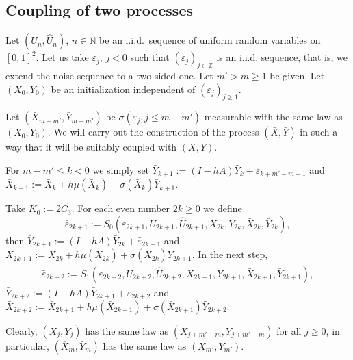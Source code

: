 \documentclass{article}
\begin{document}
\subsection{Coupling of two processes}\label{too}

Let $(U_n,\hat{U}_n)$, $n\in\mathbb{N}$ be an i.i.d.\ sequence of
uniform random variables on $[0,1]^2$. Let us take $\varepsilon_j$, $j<0$ such that $(\varepsilon_j)_{j\in\mathbb{Z}}$
is an i.i.d. sequence, that is, we extend the noise sequence to a two-sided one.
Let $m'>m\geq 1$ be given. Let $(X_0,Y_0)$ be an initialization independent of $(\varepsilon_j)_{j\geq 1}$.


Let $(\bar{X}_{m-m'},\bar{Y}_{m-m'})$ be 
$\sigma(\varepsilon_j,j\leq m-m')$-measurable with the same law as $(X_0,Y_0)$.
We will carry out the construction of the process $(\bar{X},\bar{Y})$ in such a way that it will be suitably coupled with $(X,Y)$.

For $m-m'\leq k<0$ we simply set 
$\bar{Y}_{k+1}:=(I-hA)\bar{Y}_k+\varepsilon_{k+m'-m+1}$ and 
$\bar{X}_{k+1}:=\bar{X}_k+h\mu(\bar{X}_k)+\sigma(\bar{X}_k)\bar{Y}_{k+1}$.

Take $K_{0}:=2C_{3}$. For each even number $2k\geq 0$ we define $$
\bar{\varepsilon}_{2k+1}:=
S_{0}(\varepsilon_{2k+1},U_{2k+1},\hat{U}_{2k+1},X_{2k},Y_{2k},\bar{X}_{2k},\bar{Y}_{2k}),
$$
then $\bar{Y}_{2k+1}:=(I-hA)\bar{Y}_{2k}+\bar{\varepsilon}_{2k+1}$ and 
$\bar{X}_{2k+1}:=\bar{X}_{2k}+h\mu(\bar{X}_{2k})+\sigma(\bar{X}_{2k})\bar{Y}_{2k+1}$.
In the next step,
\begin{align*}
\bar{\varepsilon}_{2k+2} \!:=\!
S_{1}(\varepsilon_{2k+2},\! U_{2k+2},\! \hat{U}_{2k+2},\! X_{2k+1},\! Y_{2k+1},\! \bar{X}_{2k+1},\! \bar{Y}_{2k+1}),  
\end{align*}
$\bar{Y}_{2k+2}:=(I-hA)\bar{Y}_{2k+1}+\bar{\varepsilon}_{2k+2}$ 
and 
$\bar{X}_{2k+2}:=\bar{X}_{2k+1}+h\mu(\bar{X}_{2k+1})+\sigma(\bar{X}_{2k+1})\bar{Y}_{2k+2}$.


Clearly, $(\bar{X}_{j},\bar{Y}_{j})$ has the same law as 
$(X_{j+m'-m},Y_{j+m'-m})$ for all $j\geq 0$, in particular,
$(\bar{X}_{m},\bar{Y}_{m})$ has the same law as 
$(X_{m'},Y_{m'})$.
\end{document}
